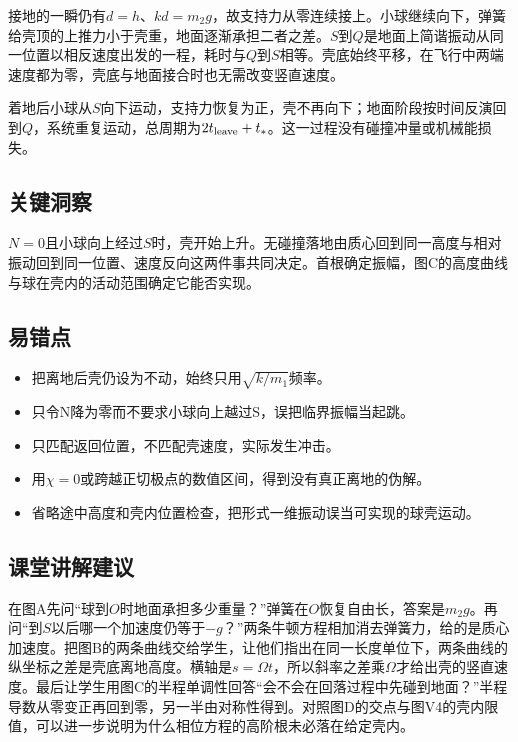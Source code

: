 \documentclass[UTF8,fontset=fandol,a4paper,11pt]{ctexart}
\begin{document}
接地的一瞬仍有$d=h$、$kd=m_2g$，故支持力从零连续接上。小球继续向下，弹簧给壳顶的上推力小于壳重，地面逐渐承担二者之差。$S$到$Q$是地面上简谐振动从同一位置以相反速度出发的一程，耗时与$Q$到$S$相等。壳底始终平移，在飞行中两端速度都为零，壳底与地面接合时也无需改变竖直速度。

着地后小球从$S$向下运动，支持力恢复为正，壳不再向下；地面阶段按时间反演回到$Q$，系统重复运动，总周期为$2t_{\rm leave}+t_*$。这一过程没有碰撞冲量或机械能损失。




\subsection*{关键洞察}

$N=0$且小球向上经过$S$时，壳开始上升。无碰撞落地由质心回到同一高度与相对振动回到同一位置、速度反向这两件事共同决定。首根确定振幅，图C的高度曲线与球在壳内的活动范围确定它能否实现。



\subsection*{易错点}

\begin{itemize}
\item 把离地后壳仍设为不动，始终只用$\sqrt{k/m_1}$频率。
\item 只令N降为零而不要求小球向上越过S，误把临界振幅当起跳。
\item 只匹配返回位置，不匹配壳速度，实际发生冲击。
\item 用$\chi=0$或跨越正切极点的数值区间，得到没有真正离地的伪解。
\item 省略途中高度和壳内位置检查，把形式一维振动误当可实现的球壳运动。
\end{itemize}



\subsection*{课堂讲解建议}

在图A先问“球到$O$时地面承担多少重量？”弹簧在$O$恢复自由长，答案是$m_2g$。再问“到$S$以后哪一个加速度仍等于$-g$？”两条牛顿方程相加消去弹簧力，给的是质心加速度。把图B的两条曲线交给学生，让他们指出在同一长度单位下，两条曲线的纵坐标之差是壳底离地高度。横轴是$s=\Omega t$，所以斜率之差乘$\Omega$才给出壳的竖直速度。最后让学生用图C的半程单调性回答“会不会在回落过程中先碰到地面？”半程导数从零变正再回到零，另一半由对称性得到。对照图D的交点与图V4的壳内限值，可以进一步说明为什么相位方程的高阶根未必落在给定壳内。
\end{document}

